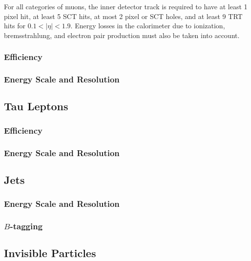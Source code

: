 For all categories of muons, the inner detector track is required to have at least 1 pixel hit, at least 5 SCT hits, at most 2 pixel or SCT holes, and at least 9 TRT hits for $0.1<|\eta|<1.9$. Energy losses in the calorimeter due to ionization, bremsstrahlung, and electron pair production must also be taken into account. 

\subsubsection{Efficiency}

\subsubsection{Energy Scale and Resolution}


\subsection{Tau Leptons}\label{sec:event-reconstruction-taus}

\subsubsection{Efficiency}

\subsubsection{Energy Scale and Resolution}



\subsection{Jets}\label{sec:event-reconstruction-jets}


\subsubsection{Energy Scale and Resolution}

\subsubsection{$B$-tagging}\label{sec:event-reconstruction-bjets}

\subsection{Invisible Particles}\label{sec:event-reconstruction-met}
